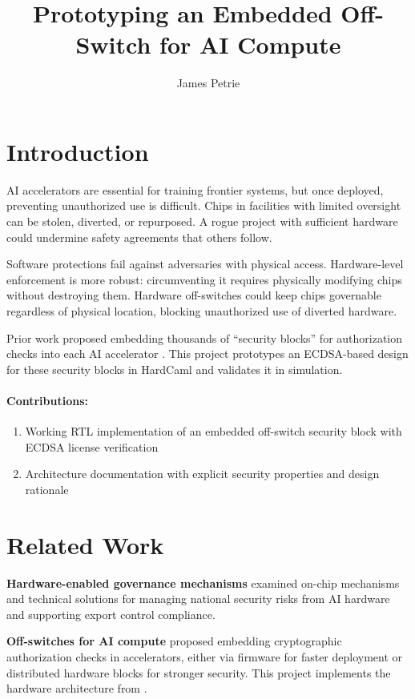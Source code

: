 \documentclass[11pt]{article}
\title{Prototyping an Embedded Off-Switch for AI Compute}
\author{James Petrie}
\date{}
\begin{document}
\maketitle

\section{Introduction}

AI accelerators are essential for training frontier systems, but once deployed, preventing unauthorized use is difficult. Chips in facilities with limited oversight can be stolen, diverted, or repurposed. A rogue project with sufficient hardware could undermine safety agreements that others follow.

Software protections fail against adversaries with physical access. Hardware-level enforcement is more robust: circumventing it requires physically modifying chips without destroying them. Hardware off-switches could keep chips governable regardless of physical location, blocking unauthorized use of diverted hardware.

Prior work proposed embedding thousands of ``security blocks'' for authorization checks into each AI accelerator \cite{petrie2025}. This project prototypes an ECDSA-based design for these security blocks in HardCaml and validates it in simulation.

\paragraph{Contributions:}
\begin{enumerate}[nosep]
    \item Working RTL implementation of an embedded off-switch security block with ECDSA license verification
    \item Architecture documentation with explicit security properties and design rationale
\end{enumerate}

\section{Related Work}

\textbf{Hardware-enabled governance mechanisms} \cite{aarne2024, kulp2024} examined on-chip mechanisms and technical solutions for managing national security risks from AI hardware and supporting export control compliance.

\textbf{Off-switches for AI compute} \cite{petrie2024, petrie2025} proposed embedding cryptographic authorization checks in accelerators, either via firmware for faster deployment or distributed hardware blocks for stronger security. This project implements the hardware architecture from \cite{petrie2025}.
\end{document}
